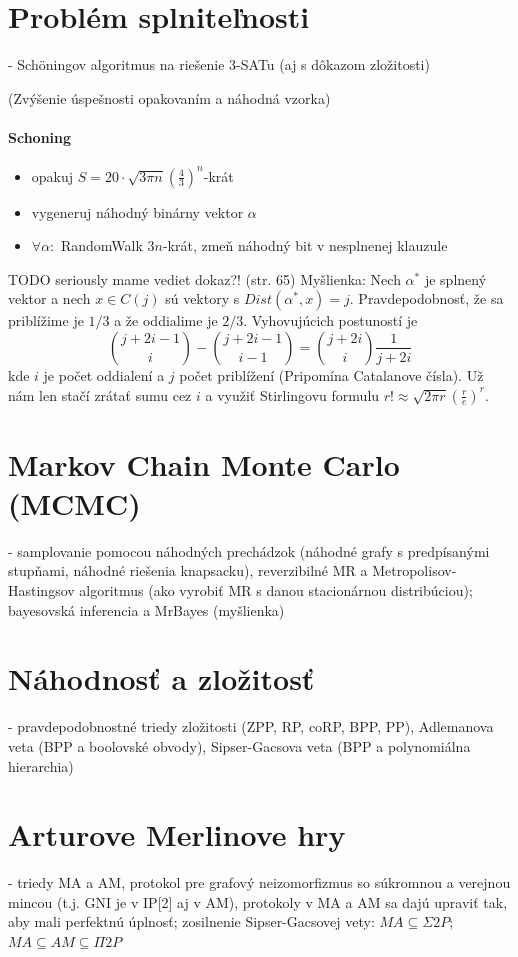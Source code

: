 \documentclass[12pt,a4paper]{article}
\begin{document}
\section{Problém splniteľnosti}
 - Schöningov algoritmus na riešenie 3-SATu (aj s dôkazom zložitosti)
 
(Zvýšenie úspešnosti opakovaním a náhodná vzorka) 
\paragraph{Schoning}
\begin{itemize} 
  \item opakuj $S = 20 \cdot \sqrt{3\pi n}(\frac{4}{3})^n$-krát
  \item vygeneruj náhodný binárny vektor $\alpha$
  \item $\forall \alpha:$ RandomWalk $3n$-krát, zmeň náhodný bit v nesplnenej klauzule
\end{itemize} 
TODO seriously mame vediet dokaz?! (str. 65) 
Myšlienka: Nech $\alpha^{*}$ je splnený vektor a nech $x \in C(j)$ sú vektory s $Dist(\alpha^{*}, x) = j$. Pravdepodobnosť, že sa priblížime je $1/3$ a že oddialime je $2/3$. Vyhovujúcich postuností je
$$
  \binom{j + 2i - 1}{i} - \binom{j + 2i - 1}{i - 1} = \binom{j + 2i}{i}\frac{1}{j + 2i}
$$
kde $i$ je počet oddialení a $j$ počet priblížení (Pripomína Catalanove čísla). Už nám len stačí zrátať sumu cez $i$ a využiť Stirlingovu formulu $r! \approx \sqrt{2\pi r}(\frac{r}{e})^r$. 

\section{Markov Chain Monte Carlo (MCMC)}
 - samplovanie pomocou náhodných prechádzok (náhodné grafy s predpísanými stupňami, náhodné riešenia knapsacku), reverzibilné MR a Metropolisov-Hastingsov algoritmus (ako vyrobiť MR s danou stacionárnou distribúciou); bayesovská inferencia a MrBayes (myšlienka)
 

\section{Náhodnosť a zložitosť}
 - pravdepodobnostné triedy zložitosti (ZPP, RP, coRP, BPP, PP), Adlemanova veta (BPP a boolovské obvody), Sipser-Gacsova veta (BPP a polynomiálna hierarchia)
 

\section{Arturove Merlinove hry}
 - triedy MA a AM, protokol pre grafový neizomorfizmus so súkromnou a verejnou mincou (t.j. GNI je v IP[2] aj v AM), protokoly v MA a AM sa dajú upraviť tak, aby mali perfektnú úplnosť; zosilnenie Sipser-Gacsovej vety: $MA \subseteq \Sigma 2P$; $MA \subseteq AM \subseteq \Pi 2P$
 
\end{document}
